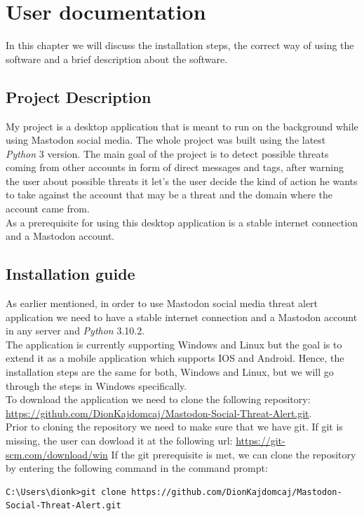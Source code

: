 \chapter{User documentation}
\label{ch:user}

In this chapter we will discuss the installation steps,
the correct way of using the software and a brief description
about the software.


\section{Project Description}
\label{s:project_desc}

My project is a desktop application that is meant to run 
on the background while using Mastodon social media. The
whole project was built using the latest \textit{Python} 3 version.
The main goal of the project is to detect possible
threats coming from other accounts in form of direct
messages and tags, after warning the user about possible 
threats it let's the user decide the kind of action
he wants to take against the account that may be a threat
and the domain where the account came from.
\\[5pt]
As a prerequisite for using this desktop application is
a stable internet connection and a Mastodon account.


\section{Installation guide}
\label{s:installation_guide}
As earlier mentioned, in order to use Mastodon social media threat alert application
we need to have a stable internet connection and a Mastodon account in any server and \textit{Python} 3.10.2.
\\[5pt]
The application is currently supporting Windows and Linux but the goal is to extend it as a 
mobile application which supports IOS and Android. Hence, the installation steps are the same for
both, Windows and Linux, but we will go through the steps in Windows specifically.
\\[5pt]
To download the application we need to clone the following repository: 
\url{https://github.com/DionKajdomcaj/Mastodon-Social-Threat-Alert.git}.
\\[5pt]
Prior to cloning the repository we need to make sure that we have git.
If git is missing, the user can dowload it at the
following url: \url{https://git-scm.com/download/win}
If the git prerequisite is met, we can clone the repository by
entering the following command in the command prompt:
\\[5pt]
\begin{lstlisting}[caption=Cloning Repository, captionpos=b]
	C:\Users\dionk>git clone https://github.com/DionKajdomcaj/Mastodon-Social-Threat-Alert.git
\end{lstlisting}

